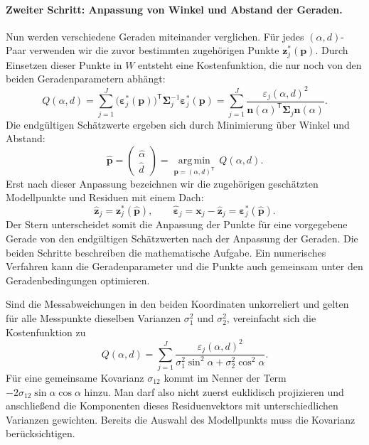 \paragraph{Zweiter Schritt: Anpassung von Winkel und Abstand der Geraden.}
Nun werden verschiedene Geraden miteinander verglichen. Für jedes
$(\alpha,d)$-Paar verwenden wir die zuvor bestimmten zugehörigen
Punkte $\mathbf{z}_j^*(\mathbf{p})$. Durch Einsetzen dieser Punkte in
$W$ entsteht eine Kostenfunktion, die nur noch von den beiden
Geradenparametern abhängt:
\begin{equation}
Q(\alpha,d)=\sum_{j=1}^{J}
\bigl(\boldsymbol{\varepsilon}_j^*(\mathbf{p})\bigr)^\mathsf{T}
\boldsymbol{\Sigma}_j^{-1}\boldsymbol{\varepsilon}_j^*(\mathbf{p})
=\sum_{j=1}^{J}\frac{\varepsilon_j(\alpha,d)^2}
{\mathbf{n}(\alpha)^\mathsf{T}\boldsymbol{\Sigma}_j\mathbf{n}(\alpha)}.
\label{KostenfktLTSVarmatrix2}
\end{equation}
Die endgültigen Schätzwerte ergeben sich durch Minimierung über
Winkel und Abstand:
\begin{equation}
\widehat{\mathbf{p}}
=\begin{pmatrix}\widehat\alpha\\\widehat d\end{pmatrix}
=\underset{\mathbf{p}=(\alpha,d)^\mathsf{T}}
{\operatorname{arg\,min}}\,Q(\alpha,d).
\label{V4GeradeParameterSchaetzung}
\end{equation}
Erst nach dieser Anpassung bezeichnen wir die zugehörigen geschätzten
Modellpunkte und Residuen mit einem Dach:
\begin{equation}
\widehat{\mathbf{z}}_j=\mathbf{z}_j^*(\widehat{\mathbf{p}}),
\qquad
\widehat{\boldsymbol{\varepsilon}}_j
=\mathbf{x}_j-\widehat{\mathbf{z}}_j
=\boldsymbol{\varepsilon}_j^*(\widehat{\mathbf{p}}).
\label{V4GeradeEndgueltigePunkte}
\end{equation}
Der Stern unterscheidet somit die Anpassung der Punkte für eine
vorgegebene Gerade von den endgültigen Schätzwerten nach der Anpassung
der Geraden. Die beiden Schritte beschreiben die mathematische
Aufgabe. Ein numerisches Verfahren kann die Geradenparameter und die
Punkte auch gemeinsam unter den Geradenbedingungen optimieren.

Sind die Messabweichungen in den beiden Koordinaten unkorreliert und
gelten für alle Messpunkte dieselben Varianzen $\sigma_1^2$ und
$\sigma_2^2$, vereinfacht sich die Kostenfunktion zu
\begin{equation}
Q(\alpha,d)=\sum_{j=1}^{J}
\frac{\varepsilon_j(\alpha,d)^2}
{\sigma_1^2\sin^2\alpha+\sigma_2^2\cos^2\alpha}.
\label{KostenfktLTSVarmatrix1}
\end{equation}
Für eine gemeinsame Kovarianz $\sigma_{12}$ kommt im Nenner der Term
$-2\sigma_{12}\sin\alpha\cos\alpha$ hinzu.
Man darf also nicht zuerst euklidisch projizieren und anschließend die
Komponenten dieses Residuenvektors mit unterschiedlichen Varianzen
gewichten. Bereits die Auswahl des Modellpunkts muss die Kovarianz
berücksichtigen.


